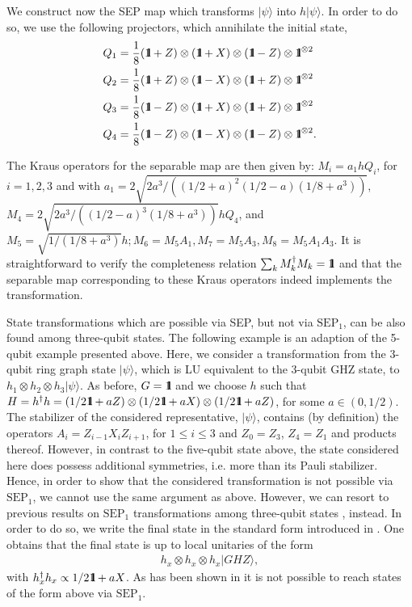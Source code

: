 \documentclass[superscriptaddress,twocolumn]{revtex4}\usepackage[utf8]{inputenc}
\newcommand{\one}{\mbox{$1 \hspace{-1.0mm}  {\bf l}$}}
\newcommand{\ket}[1]{|#1\rangle}
\begin{document}
We construct now the SEP map which transforms $\ket{\psi}$ into $h \ket{\psi}$. In order to do so, we use the following projectors, which annihilate the initial state,
\begin{align}
Q_1&=\frac{1}{8}(\one+Z)\otimes (\one+ X)\otimes (\one- Z) \otimes \one^{\otimes 2}\label{eq:1}\\
Q_2&=\frac{1}{8}(\one+Z)\otimes (\one- X)\otimes (\one + Z) \otimes \one^{\otimes 2}\\
Q_3&=\frac{1}{8}(\one-Z)\otimes (\one+ X)\otimes (\one+ Z) \otimes \one^{\otimes 2}\\
Q_4&=\frac{1}{8}(\one-Z)\otimes (\one- X)\otimes (\one- Z) \otimes \one^{\otimes 2}.\label{eq:2}
\end{align}



The Kraus operators for the separable map are then given by:
$M_i=a_1 hQ_i$, for $i=1,2,3$ and with $a_1=2\sqrt{2a^3/((1/2+a)^2(1/2-a)(1/8+a^3))}$, $M_4 =2\sqrt{2a^3/((1/2-a)^3(1/8+a^3))} h Q_4$, and $M_5=\sqrt{1/(1/8+a^3)}h; M_6=M_5 A_1, M_7=M_5 A_3,M_8=M_5 A_1 A_3$. It is straightforward to verify the completeness relation $\sum_k M_k^\dagger M_k=\one$ and that the separable map corresponding to these Kraus operators indeed implements the transformation.



State transformations which are possible via SEP, but not via $\textrm{SEP}_1$, can be also found among three-qubit states. The following example is an adaption of the 5-qubit example presented above. Here, we consider a transformation from the 3-qubit ring graph state $\ket{\psi}$, which is LU equivalent to the 3-qubit GHZ state, to
$h_1 \otimes h_2 \otimes h_3 \ket{\psi}$. As before, $G=\one$ and we choose $h$ such that $H=h^\dagger h= (1/2 \one +a Z)\otimes (1/2 \one +a X)\otimes (1/2 \one+a Z)$, for some $a\in (0,1/2)$.
The stabilizer of the considered representative, $\ket{\psi}$, contains (by definition) the operators $A_i=Z_{i-1} X_i Z_{i+1}$, for $1\leq i \leq 3$ and $Z_0= Z_3$, $Z_4=Z_1$ and products thereof. However, in contrast to the five-qubit state above, the state considered here does possess additional symmetries, i.e. more than its Pauli stabilizer. Hence, in order to show that the considered transformation is not possible via $\textrm{SEP}_1$, we cannot use the same argument as above. However, we can resort to previous results on $\textrm{SEP}_1$ transformations among three-qubit states \cite{deSp13}, instead. In order to do so, we write the final state in the standard form  introduced in \cite{deSp13}. One obtains that the final state is up to local unitaries of the form
\begin{align}
h_x \otimes h_x \otimes h_x \ket{GHZ},
\end{align}
with $h_x^\dagger h_x\propto 1/2 \one +a X$. As has been shown in \cite{deSp13} it is not possible to reach states of the form above via  $\textrm{SEP}_1$.
\end{document}
